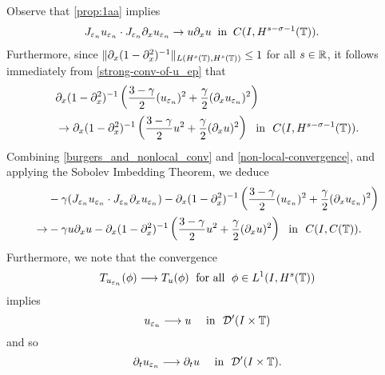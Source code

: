 %
Observe that \cref{prop:1aa} implies
\begin{equation}
\begin{split}
\label{burgers_and_nonlocal_conv}
&  J_{\varepsilon_n} u_{\varepsilon_n} 
\cdot J_{\varepsilon_n} \partial_x u_{\varepsilon_n} 
\to  u \partial_x u \; \; 
\text{in} \; \;
C(I, H^{s-\sigma-1}(\mathbb{T})). 
\end{split}
\end{equation}
%
Furthermore, since $\|\partial_x (1-\partial_x^2)^{-1}\|_{L(H^s(\mathbb{T}), H^s(\mathbb{T}))}
\le 1$ for all $s \in \mathbb{R}$, it follows immediately from
\eqref{strong-conv-of-u_ep} that
\begin{equation}
\begin{split}
& \partial_x(1- \partial_x^2)^{-1} \left( \frac{3-\gamma}{2}
(u_{\varepsilon_n})^2
+ \frac{\gamma}{2} (\partial_x u_{\varepsilon_n})^2 \right )
\\
& \to
\partial_x(1- \partial_x^2)^{-1} \left( \frac{3-\gamma}{2} u^2
+ \frac{\gamma}{2} (\partial_x u)^2 \right ) \ \
\text{in} \ \ C(I, H^{s-\sigma-1}(\mathbb{T})).
\label{non-local-convergence}
\end{split}
\end{equation}
Combining \eqref{burgers_and_nonlocal_conv} and
\eqref{non-local-convergence}, and applying the Sobolev Imbedding
Theorem, we deduce 
\begin{equation}
\begin{split}
& -\gamma (J_{\varepsilon_n} u_{\varepsilon_n} \cdot J_{\varepsilon_n} \partial_x
u_{\varepsilon_n}) - \partial_x(1- \partial_x^2)^{-1} \left( \frac{3-\gamma}{2}
(u_{\varepsilon_n})^2
+ \frac{\gamma}{2} (\partial_x u_{\varepsilon_n})^2 \right )
\\
\to & -\gamma u \partial_x u -
\partial_x(1- \partial_x^2)^{-1} \left( \frac{3-\gamma}{2} u^2
+ \frac{\gamma}{2} (\partial_x u)^2 \right ) \ \
\text{in} \ \ C(I, C(\mathbb{T})).
\label{loc-non-loc-tog}
\end{split}
\end{equation}
Furthermore, we note that the convergence  
%
\begin{equation}
\label{weak-conv-2}
T_{u_{\varepsilon_n}}(\phi)  \longrightarrow  T_u(\phi) \;
\ \text{for all} \  \;  \phi \in L^1(I, H^{s}(\mathbb{T}))
\end{equation}
%
implies
%
\begin{equation}
u_{\varepsilon_n}  \longrightarrow  u
\quad
\ \text{in} \   \,\,
\mathcal{D}'(I\times \mathbb{T})
\end{equation}
%
and so
%
\begin{equation}
\label{distib-conv-2}
\partial_tu_{\varepsilon_n}  \longrightarrow  \partial_tu
\quad
\ \text{in} \   \,\, \mathcal{D}'(I\times \mathbb{T}).
\end{equation}

